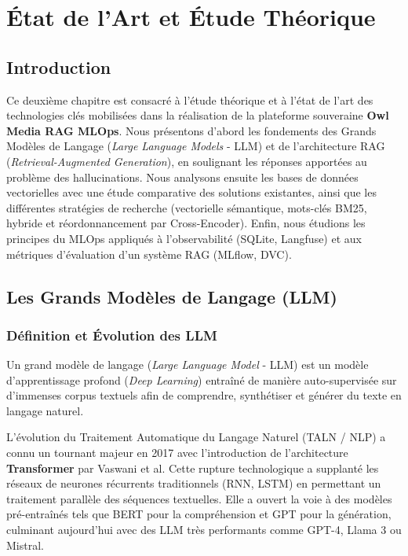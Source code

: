 \chapter{État de l'Art et Étude Théorique}
\label{chap:etat_art}

\section{Introduction}
Ce deuxième chapitre est consacré à l'étude théorique et à l'état de l'art des technologies clés mobilisées dans la réalisation de la plateforme souveraine \textbf{Owl Media RAG MLOps}. Nous présentons d'abord les fondements des Grands Modèles de Langage (\textit{Large Language Models} - LLM) et de l'architecture RAG (\textit{Retrieval-Augmented Generation}), en soulignant les réponses apportées au problème des hallucinations. Nous analysons ensuite les bases de données vectorielles avec une étude comparative des solutions existantes, ainsi que les différentes stratégies de recherche (vectorielle sémantique, mots-clés BM25, hybride et réordonnancement par Cross-Encoder). Enfin, nous étudions les principes du MLOps appliqués à l'observabilité (SQLite, Langfuse) et aux métriques d'évaluation d'un système RAG (MLflow, DVC).

\section{Les Grands Modèles de Langage (LLM)}

\subsection{Définition et Évolution des LLM}
Un grand modèle de langage (\textit{Large Language Model} - LLM) est un modèle d'apprentissage profond (\textit{Deep Learning}) entraîné de manière auto-supervisée sur d'immenses corpus textuels afin de comprendre, synthétiser et générer du texte en langage naturel. 

L'évolution du Traitement Automatique du Langage Naturel (TALN / NLP) a connu un tournant majeur en 2017 avec l'introduction de l'architecture \textbf{Transformer} par Vaswani et al. Cette rupture technologique a supplanté les réseaux de neurones récurrents traditionnels (RNN, LSTM) en permettant un traitement parallèle des séquences textuelles. Elle a ouvert la voie à des modèles pré-entraînés tels que BERT pour la compréhension et GPT pour la génération, culminant aujourd'hui avec des LLM très performants comme GPT-4, Llama 3 ou Mistral.

